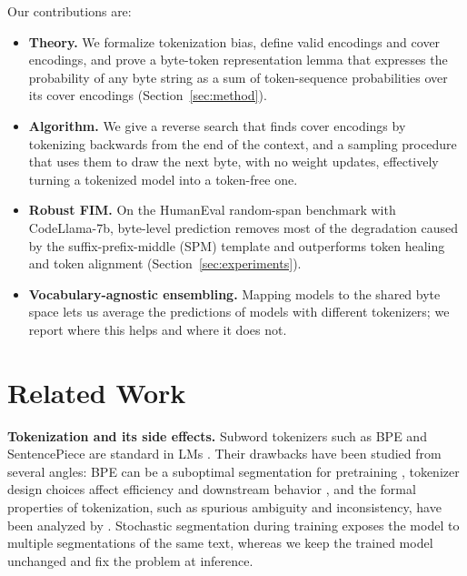\documentclass{article} %
\begin{document}
Our contributions are:
\begin{itemize}
\item \textbf{Theory.} We formalize tokenization bias, define valid encodings and cover encodings, and prove a byte-token representation lemma that expresses the probability of any byte string as a sum of token-sequence probabilities over its cover encodings (Section~\ref{sec:method}).
\item \textbf{Algorithm.} We give a reverse search that finds cover encodings by tokenizing backwards from the end of the context, and a sampling procedure that uses them to draw the next byte, with no weight updates, effectively turning a tokenized model into a token-free one.
\item \textbf{Robust FIM.} On the HumanEval random-span benchmark with CodeLlama-7b, byte-level prediction removes most of the degradation caused by the suffix-prefix-middle (SPM) template and outperforms token healing and token alignment (Section~\ref{sec:experiments}).
\item \textbf{Vocabulary-agnostic ensembling.} Mapping models to the shared byte space lets us average the predictions of models with different tokenizers; we report where this helps and where it does not.
\end{itemize}

\section{Related Work}
\label{sec:related_work}
\textbf{Tokenization and its side effects.} Subword tokenizers such as BPE \citep{gage1994new,sennrich2016neural} and SentencePiece \citep{kudo2018sentencepiece} are standard in LMs \citep{radford2019language,touvron2023llama,jiang2023mistral}. Their drawbacks have been studied from several angles: BPE can be a suboptimal segmentation for pretraining \citep{bostrom2020byte}, tokenizer design choices affect efficiency and downstream behavior \citep{dagan2024getting}, and the formal properties of tokenization, such as spurious ambiguity and inconsistency, have been analyzed by \citet{gastaldi2024foundations}. Stochastic segmentation during training \citep{kudo2018subword,provilkov2020bpe} exposes the model to multiple segmentations of the same text, whereas we keep the trained model unchanged and fix the problem at inference.
\end{document}
